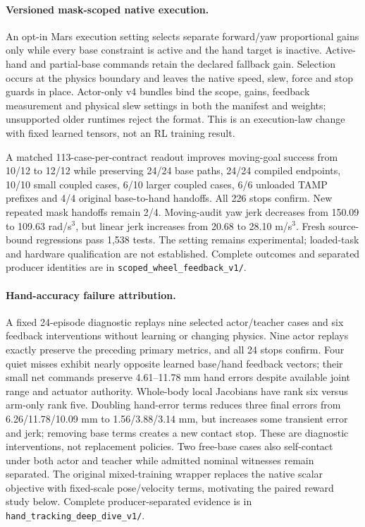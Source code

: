 \paragraph{Versioned mask-scoped native execution.}
An opt-in Mars execution setting selects separate forward/yaw proportional
gains only while every base constraint is active and the hand target is
inactive. Active-hand and partial-base commands retain the declared fallback
gain. Selection occurs at the physics boundary and leaves the native speed,
slew, force and stop guards in place. Actor-only v4 bundles bind the scope,
gains, feedback measurement and physical slew settings in both the manifest
and weights; unsupported older runtimes reject the format. This is an
execution-law change with fixed learned tensors, not an RL training result.

A matched 113-case-per-contract readout improves moving-goal success from
10/12 to 12/12 while preserving 24/24 base paths, 24/24 compiled endpoints,
10/10 small coupled cases, 6/10 larger coupled cases, 6/6 unloaded TAMP prefixes
and 4/4 original base-to-hand handoffs. All 226 stops confirm. New repeated
mask handoffs remain 2/4. Moving-audit yaw jerk decreases from 150.09 to
109.63 rad/s$^3$, but linear jerk increases from 20.68 to 28.10 m/s$^3$.
Fresh source-bound regressions pass 1,538 tests. The setting remains experimental;
loaded-task and hardware qualification are not established. Complete outcomes
and separated producer identities are in \texttt{scoped\_wheel\_feedback\_v1/}.


\paragraph{Hand-accuracy failure attribution.}
A fixed 24-episode diagnostic replays nine selected actor/teacher cases and six
feedback interventions without learning or changing physics. Nine actor replays
exactly preserve the preceding primary metrics, and all 24 stops confirm. Four
quiet misses exhibit nearly opposite learned base/hand feedback vectors; their
small net commands preserve 4.61--11.78 mm hand errors despite available joint
range and actuator authority. Whole-body local Jacobians have rank six versus
arm-only rank five. Doubling hand-error terms reduces three final errors from
6.26/11.78/10.09 mm to 1.56/3.88/3.14 mm, but increases some transient error and
jerk; removing base terms creates a new contact stop. These are diagnostic
interventions, not replacement policies. Two free-base cases also self-contact
under both actor and teacher while admitted nominal witnesses remain separated.
The original mixed-training wrapper replaces the native scalar objective with
fixed-scale pose/velocity terms, motivating the paired reward study below. Complete producer-separated evidence is in
\texttt{hand\_tracking\_deep\_dive\_v1/}.


